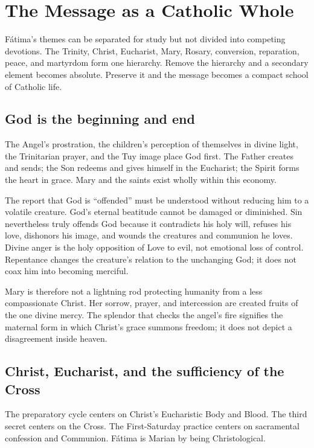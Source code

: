 \section{The Message as a Catholic Whole}

Fátima's themes can be separated for study but not divided into competing devotions. The Trinity, Christ, Eucharist, Mary, Rosary, conversion, reparation, peace, and martyrdom form one hierarchy. Remove the hierarchy and a secondary element becomes absolute. Preserve it and the message becomes a compact school of Catholic life.

\subsection{God is the beginning and end}

The Angel's prostration, the children's perception of themselves in divine light, the Trinitarian prayer, and the Tuy image place God first. The Father creates and sends; the Son redeems and gives himself in the Eucharist; the Spirit forms the heart in grace. Mary and the saints exist wholly within this economy.

The report that God is “offended” must be understood without reducing him to a volatile creature. God's eternal beatitude cannot be damaged or diminished. Sin nevertheless truly offends God because it contradicts his holy will, refuses his love, dishonors his image, and wounds the creatures and communion he loves. Divine anger is the holy opposition of Love to evil, not emotional loss of control. Repentance changes the creature's relation to the unchanging God; it does not coax him into becoming merciful.

Mary is therefore not a lightning rod protecting humanity from a less compassionate Christ. Her sorrow, prayer, and intercession are created fruits of the one divine mercy. The splendor that checks the angel's fire signifies the maternal form in which Christ's grace summons freedom; it does not depict a disagreement inside heaven.

\subsection{Christ, Eucharist, and the sufficiency of the Cross}

The preparatory cycle centers on Christ's Eucharistic Body and Blood. The third secret centers on the Cross. The First-Saturday practice centers on sacramental confession and Communion. Fátima is Marian by being Christological.

